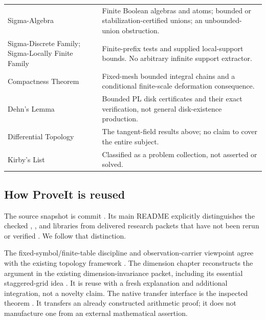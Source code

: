 \begin{longtable}{P{.28\textwidth}P{.64\textwidth}}
Sigma-Algebra &
Finite Boolean algebras and atoms; bounded or stabilization-certified unions; an unbounded-union obstruction.\\
Sigma-Discrete Family; Sigma-Locally Finite Family &
Finite-prefix tests and supplied local-support bounds. No arbitrary infinite support extractor.\\
Compactness Theorem &
Fixed-mesh bounded integral chains and a conditional finite-scale deformation consequence.\\
Dehn's Lemma &
Bounded PL disk certificates and their exact verification, not general disk-existence production.\\
Differential Topology &
The tangent-field results above; no claim to cover the entire subject.\\
Kirby's List &
Classified as a problem collection, not asserted or solved.\\
\bottomrule
\end{longtable}

\subsection{How ProveIt is reused}

The source snapshot is commit . Its main README explicitly distinguishes the checked , , and  libraries from delivered research packets that have not been rerun or verified \cite{RepoReadme}. We follow that distinction.

The fixed-symbol/finite-table discipline and observation-carrier viewpoint agree with the existing topology framework \cite{RepoTopology}. The dimension chapter reconstructs the argument in the existing dimension-invariance packet, including its essential staggered-grid idea \cite{RepoDimension}. It is reuse with a fresh explanation and additional integration, not a novelty claim. The native transfer interface is the inspected  theorem \cite{RepoNative}. It transfers an already constructed arithmetic proof; it does not manufacture one from an external mathematical assertion.

